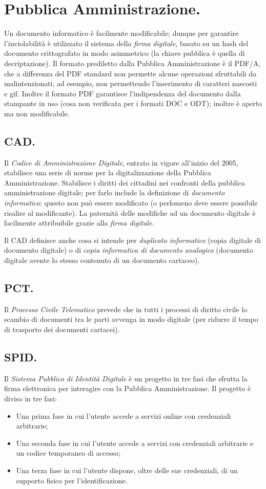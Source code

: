 \documentclass[a4page, 11pt, twocolumn]{article}
\begin{document}
\section{Pubblica Amministrazione.}
Un documento informatico è facilmente modificabile; dunque per garantire l'inviolabilità è utilizzato il sistema della \textit{firma digitale}, basato su un hash del documento crittografato in modo asimmetrico (la chiave pubblica è quella di decriptazione).
Il formato prediletto dalla Pubblica Amministrazione è il PDF/A, che a differenza del PDF standard non permette alcune operazioni sfruttabili da malintenzionati, ad esempio, non permettendo l'inserimento di caratteri nascosti e gif.
Inoltre il formato PDF garantisce l'indipendenza del documento dalla stampante in uso (cosa non verificata per i formati DOC e ODT); inoltre è aperto ma non modificabile.

\subsection{CAD.}
Il \textit{Codice di Amministrazione Digitale}, entrato in vigore all'inizio del 2005, stabilisce una serie di norme per la digitalizzazione della Pubblica Amministrazione.
Stabilisce i diritti dei cittadini nei confronti della pubblica amministrazione digitale; per farlo include la definizione di \textit{documento informatico}: questo non può essere modificato (o perlomeno deve essere possibile risalire al modificante).
La paternità delle modifiche ad un documento digitale è facilmente attribuibile grazie alla \textit{firma digitale}.

Il CAD definisce anche cosa si intende per \textit{duplicato informatico} (copia digitale di documento digitale) o di \textit{copia informatica di documento analogico} (documento digitale avente lo stesso contenuto di un documento cartaceo).

\subsection{PCT.}
Il \textit{Processo Civile Telematico} prevede che in tutti i processi di diritto civile lo scambio di documenti tra le parti avvenga in modo digitale (per ridurre il tempo di trasporto dei documenti cartacei). \newline

\subsection{SPID.}
Il \textit{Sistema Pubblico di Identità Digitale} è un progetto in tre fasi che sfrutta la firma elettronica per interagire con la Pubblica Amministrazione. Il progetto è diviso in tre fasi:
\begin{itemize}
\item Una prima fase in cui l'utente accede a servizi online con credenziali arbitrarie;
\item Una seconda fase in cui l'utente accede a servizi con credenziali arbitrarie e un codice temporaneo di accesso;
\item Una terza fase in cui l'utente dispone, oltre delle sue credenziali, di un supporto fisico per l'identificazione.
\end{itemize}
\end{document}
